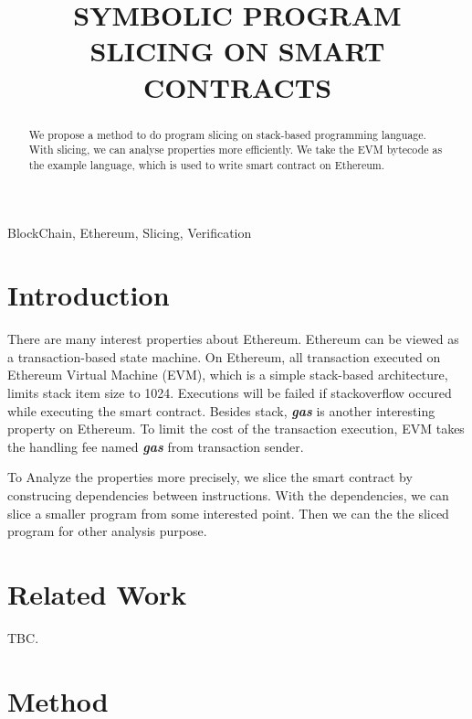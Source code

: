 \documentclass{article}
\title{SYMBOLIC PROGRAM SLICING ON SMART CONTRACTS}
\begin{document}
%

\maketitle

%

\begin{abstract}

  We propose a method to do program slicing on stack-based programming language. With slicing, we can analyse properties more efficiently. We take the EVM bytecode\cite{wood2014ethereum} as the example language, which is used to write smart contract\cite{szabo2003advances} on Ethereum\cite{wood2014ethereum}.

\end{abstract}

\begin{keywords}
  BlockChain, Ethereum, Slicing, Verification
\end{keywords}


\section{Introduction}
\label{sec:introduction}

There are many interest properties about Ethereum. Ethereum can be viewed as a transaction-based state machine. On Ethereum, all transaction executed on Ethereum Virtual Machine (EVM), which is a simple stack-based architecture, limits stack item size to 1024. Executions will be failed if stackoverflow occured while executing the smart contract. Besides stack, \textbf{\textit{gas}} is another interesting property on Ethereum. To limit the cost of the transaction execution, EVM takes the handling fee named \textbf{\textit{gas}} from transaction sender.

To Analyze the properties more precisely, we slice the smart contract by construcing dependencies between instructions. With the dependencies, we can slice a smaller program from some interested point. Then we can the the sliced program for other analysis purpose.

\section{Related Work}
\label{sec:relatedwork}

TBC.

\section{Method}
\label{sec:method}
\end{document}

